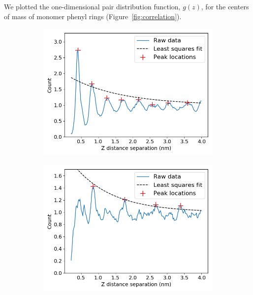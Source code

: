 \documentclass[journal=jpcbfk,manusciprt=article]{achemso}
\begin{document}
  We plotted the one-dimensional pair distribution function, $g(z)$, for the centers
  of mass of monomer phenyl rings (Figure~\ref{fig:correlation}).
  
  \begin{figure}
  \centering
  \begin{subfigure}{0.45\textwidth}
  \centering
  \includegraphics[width=\textwidth]{z_correlation_sandwich.png}
  \caption{}\label{fig:z_correlation_sandwich}
  \end{subfigure}  
  \begin{subfigure}{0.45\textwidth}
  \centering
  \includegraphics[width=\textwidth]{z_correlation_offset.png}
  \caption{}\label{fig:z_correlation_offset}

\end{subfigure}
\end{figure}
\end{document}
